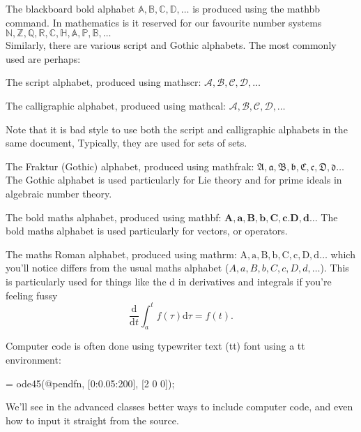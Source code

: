 \documentclass[a4paper,11pt]{article}
\begin{document}
The blackboard bold alphabet $\mathbb{A},\mathbb{B}, \mathbb{C}, \mathbb{D},\dots$
is produced using the mathbb command. In mathematics is it reserved 
for our favourite number systems
$\mathbb{N}, 	%
\mathbb{Z},		%
\mathbb{Q},		%
\mathbb{R}, 	%
\mathbb{C},		%
\mathbb{H},		%
\mathbb{A},		%
\mathbb{P},		%
\mathbb{B},		%
\dots$\\

Similarly, there are various script and Gothic alphabets. The most commonly used are perhaps:

The script alphabet, produced using mathscr: 
$\mathscr{A},\mathscr{B}, \mathscr{C}, \mathscr{D},\dots$

The calligraphic alphabet, produced using mathcal: 
 $\mathcal{A},\mathcal{B}, \mathcal{C}, \mathcal{D},\dots$

Note that it is bad style to use both the script and calligraphic alphabets in the same document, Typically, they are used for sets of sets. 

The Fraktur (Gothic) alphabet, produced using mathfrak: 
 $\mathfrak{A},\mathfrak{a}, \mathfrak{B},\mathfrak{b}, \mathfrak{C}, \mathfrak{c}, \mathfrak{D},\mathfrak{d}\dots$
The Gothic alphabet is used particularly for Lie theory and for prime ideals in algebraic number theory.

The bold maths alphabet, produced using mathbf: 
$\mathbf{A},\mathbf{a}, \mathbf{B},\mathbf{b}, \mathbf{C},\mathbf{c}. \mathbf{D},\mathbf{d}\dots$
The bold maths alphabet is used particularly for vectors, or operators.

The maths Roman alphabet, produced using mathrm: 
$\mathrm{A},\mathrm{a}, \mathrm{B},\mathrm{b},  \mathrm{C},\mathrm{c},  
\mathrm{D},\mathrm{d}\dots$
which you'll notice differs from the usual maths alphabet 
 ($A, a,B,b,C,c,D,d,\dots$).
This is particularly used for things like the d in derivatives and integrals if you're feeling fussy
\[ 
\frac{\mathrm{d}}{\mathrm{d} t} \int_a^t f(\tau) \mathrm{d} \tau = f(t).
\]
 
Computer code is often done using typewriter text (tt) font using a tt environment:
\begin{tt}
	[T,X] = ode45(@pendfn, [0:0.05:200], [2 0 0]); 
\end{tt}
We'll see in the advanced classes better ways to include computer code, and even how to input it straight from the source.  
\end{document}
